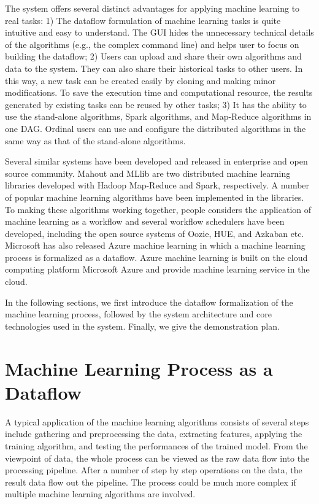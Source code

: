 \documentclass{sig-alternate-05-2015}
\begin{document}
The system offers several distinct advantages for applying machine learning to real tasks: 1) The dataflow formulation of machine learning tasks is quite intuitive and easy to understand. The GUI hides the unnecessary technical details of the algorithms (e.g., the complex command line) and helps user to focus on building the dataflow; 2) Users can upload and share their own algorithms and data to the system. They can also share their historical tasks to other users. In this way, a new task can be created easily by cloning and making minor modifications. To save the execution time and computational resource, the results generated by existing tasks can be reused by other tasks; 3) It has the ability to use the stand-alone algorithms, Spark algorithms, and Map-Reduce algorithms in one DAG. Ordinal users can use and configure the distributed algorithms in the same way as that of the stand-alone algorithms.

Several similar systems have been developed and released in enterprise and open source community. Mahout and MLlib are two distributed machine learning libraries developed with Hadoop Map-Reduce and Spark, respectively. A number of popular machine learning algorithms have been implemented in the libraries. To making these algorithms working together, people considers the application of machine learning as a workflow and several workflow schedulers have been developed, including the open source systems of Oozie, HUE, and Azkaban etc. Microsoft has also released Azure machine learning in which a machine learning process is formalized as a dataflow. Azure machine learning is built on the cloud computing platform Microsoft Azure and provide machine learning service in the cloud.

In the following sections, we first introduce the dataflow formalization of the machine learning process, followed by the system architecture and core technologies used in the system. Finally, we give the demonstration plan.

\section{Machine Learning Process as a Dataflow}
A typical application of the machine learning algorithms consists of several steps include gathering and preprocessing the data, extracting features, applying the training algorithm, and testing the performances of the trained model. From the viewpoint of data, the whole process can be viewed as the raw data flow into the processing pipeline. After a number of step by step operations on the data, the result data flow out the pipeline. The process could be much more complex if multiple machine learning algorithms are involved.
\end{document}

